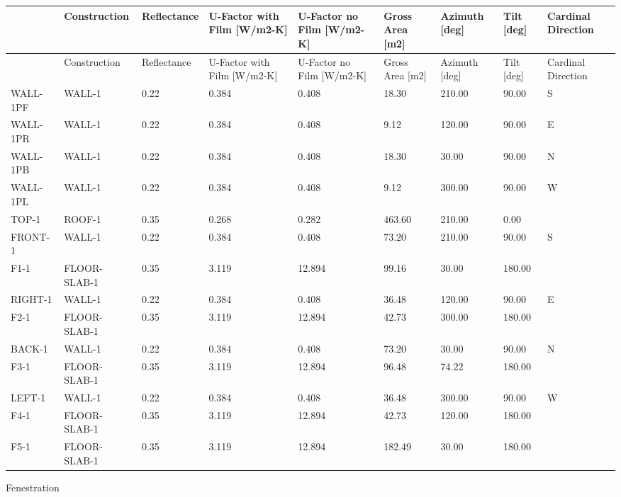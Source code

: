\begin{longtable}[c]{p{0.66in}p{0.66in}p{0.66in}p{0.66in}p{0.66in}p{0.66in}p{0.66in}p{0.66in}p{0.66in}}
\toprule 
~ & Construction & Reflectance & U-Factor with Film [W/m2-K] & U-Factor no Film [W/m2-K] & Gross Area [m2] & Azimuth [deg] & Tilt [deg] & Cardinal Direction \tabularnewline
\midrule
\endfirsthead

\toprule 
~ & Construction & Reflectance & U-Factor with Film [W/m2-K] & U-Factor no Film [W/m2-K] & Gross Area [m2] & Azimuth [deg] & Tilt [deg] & Cardinal Direction \tabularnewline
\midrule
\endhead

WALL-1PF & WALL-1 & 0.22 & 0.384 & 0.408 & 18.30 & 210.00 & 90.00 & S \tabularnewline
WALL-1PR & WALL-1 & 0.22 & 0.384 & 0.408 & 9.12 & 120.00 & 90.00 & E \tabularnewline
WALL-1PB & WALL-1 & 0.22 & 0.384 & 0.408 & 18.30 & 30.00 & 90.00 & N \tabularnewline
WALL-1PL & WALL-1 & 0.22 & 0.384 & 0.408 & 9.12 & 300.00 & 90.00 & W \tabularnewline
TOP-1 & ROOF-1 & 0.35 & 0.268 & 0.282 & 463.60 & 210.00 & 0.00 & ~ \tabularnewline
FRONT-1 & WALL-1 & 0.22 & 0.384 & 0.408 & 73.20 & 210.00 & 90.00 & S \tabularnewline
F1-1 & FLOOR-SLAB-1 & 0.35 & 3.119 & 12.894 & 99.16 & 30.00 & 180.00 & ~ \tabularnewline
RIGHT-1 & WALL-1 & 0.22 & 0.384 & 0.408 & 36.48 & 120.00 & 90.00 & E \tabularnewline
F2-1 & FLOOR-SLAB-1 & 0.35 & 3.119 & 12.894 & 42.73 & 300.00 & 180.00 & ~ \tabularnewline
BACK-1 & WALL-1 & 0.22 & 0.384 & 0.408 & 73.20 & 30.00 & 90.00 & N \tabularnewline
F3-1 & FLOOR-SLAB-1 & 0.35 & 3.119 & 12.894 & 96.48 & 74.22 & 180.00 & ~ \tabularnewline
LEFT-1 & WALL-1 & 0.22 & 0.384 & 0.408 & 36.48 & 300.00 & 90.00 & W \tabularnewline
F4-1 & FLOOR-SLAB-1 & 0.35 & 3.119 & 12.894 & 42.73 & 120.00 & 180.00 & ~ \tabularnewline
F5-1 & FLOOR-SLAB-1 & 0.35 & 3.119 & 12.894 & 182.49 & 30.00 & 180.00 & ~ \tabularnewline
\bottomrule
\end{longtable}

Fenestration

